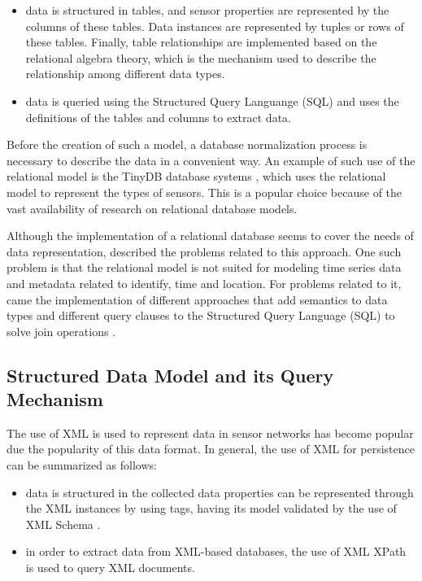 \begin{itemize}
  \item data is structured in tables, and sensor properties are represented by
  the columns of these tables. Data instances are represented by tuples or rows
  of these tables. Finally, table relationships are implemented based on the
  relational algebra theory, which is the mechanism used to describe the
  relationship among different data types.
  \item data is queried using the Structured Query Languange (SQL) and uses the
  definitions of the tables and columns to extract data.
\end{itemize}

Before the creation of such a model, a database normalization process is
necessary to describe the data in a convenient way. An example of such use of
the relational model is the TinyDB database systems \cite{sn-db-tinydb}, which
uses the relational model to represent the types of sensors. This is a popular
choice because of the vast availability of research on relational database
models.

Although the implementation of a relational database seems to cover the needs
of data representation, \cite{sn-data-model-survey} described the problems
related to this approach. One such problem is that the relational model is not
suited for modeling time series data and metadata related to identify, time
and location. For problems related to it, came the implementation of different
approaches that add semantics to data types and different query clauses to the
Structured Query Language (SQL) to solve join operations \cite{sn-db-newop}. 

\subsection{Structured Data Model and its Query Mechanism}

The use of XML is used to represent data in sensor networks has become popular
due the popularity of this data format. In general, the use of XML for
persistence can be summarized as follows:

\begin{itemize}
  \item data is structured in the collected data properties can be represented
  through the XML \cite{xml} instances by using tags, having its model validated
  by the use of XML Schema \cite{xml-schema}.
  \item in order to extract data from XML-based databases, the use of XML XPath
  \cite{xml-xpath} is used to query XML documents.
\end{itemize}

